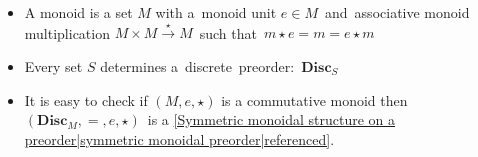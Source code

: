 
\begin{itemize}
    \item A monoid is a set $M$ with a \,monoid unit $e \in M$\, and \,associative monoid multiplication $M \times M \xrightarrow{\star} M$\, such that \,$m \star e=m=e \star m$\,
    \item Every set $S$ determines a \,discrete\, preorder: \,$\mathbf{Disc}_S$\,
    \item It is easy to check if $(M,e,\star)$ is a commutative monoid then \,$(\mathbf{Disc}_M, =, e, \star)$\, is a \ref{Symmetric monoidal structure on a preorder|symmetric monoidal preorder|referenced}.
  \end{itemize}